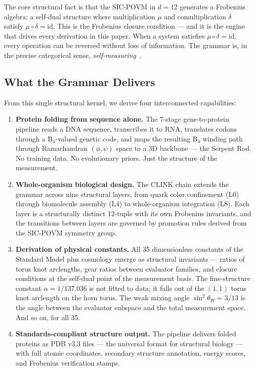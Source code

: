 \documentclass[11pt,a4paper,twocolumn]{article}
\begin{document}
The core structural fact is that the SIC-POVM in $d=12$ generates a Frobenius algebra: a self-dual structure where multiplication $\mu$ and comultiplication $\delta$ satisfy $\mu \circ \delta = \text{id}$. This is the Frobenius closure condition — and it is the engine that drives every derivation in this paper. When a system satisfies $\mu \circ \delta = \text{id}$, every operation can be reversed without loss of information. The grammar is, in the precise categorical sense, \emph{self-measuring}~\cite{coecke2011categories}.

\subsection{What the Grammar Delivers}

From this single structural kernel, we derive four interconnected capabilities:

\begin{enumerate}
\item \textbf{Protein folding from sequence alone.} The 7-stage gene-to-protein pipeline reads a DNA sequence, transcribes it to RNA, translates codons through a B$_4$-valued genetic code, and maps the resulting B$_4$ winding path through Ramachandran $(\phi,\psi)$ space to a 3D backbone — the Serpent Rod. No training data. No evolutionary priors. Just the structure of the measurement.

\item \textbf{Whole-organism biological design.} The CLINK chain extends the grammar across nine structural layers, from quark color confinement (L0) through biomolecule assembly (L4) to whole-organism integration (L8). Each layer is a structurally distinct 12-tuple with its own Frobenius invariants, and the transitions between layers are governed by promotion rules derived from the SIC-POVM symmetry group.

\item \textbf{Derivation of physical constants.} All 35 dimensionless constants of the Standard Model plus cosmology emerge as structural invariants — ratios of torus knot arclengths, gear ratios between evaluator families, and closure conditions at the self-dual point of the measurement basis. The fine-structure constant $\alpha = 1/137.036$ is not fitted to data; it falls out of the $(1,1)$ torus knot arclength on the horn torus. The weak mixing angle $\sin^2\theta_W = 3/13$ is the angle between the evaluator subspace and the total measurement space. And so on, for all 35.

\item \textbf{Standards-compliant structure output.} The pipeline delivers folded proteins as PDB v3.3 files — the universal format for structural biology — with full atomic coordinates, secondary structure annotation, energy scores, and Frobenius verification stamps.
\end{enumerate}
\end{document}
